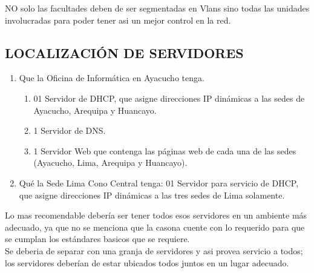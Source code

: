 NO solo las facultades deben de ser segmentadas en Vlans sino todas las unidades involucradas para poder tener asi un mejor control en la red.
\subsection{LOCALIZACI\'ON DE SERVIDORES}
\begin{definicion}[]
{
\begin{enumerate}[label=\itembolasazules{}]
\item Que la Oficina de Inform\'atica en Ayacucho tenga.

\begin{enumerate}[label=\itembolas{}]
\item 01 Servidor de DHCP, que asigne direcciones IP din\'amicas a las
sedes de Ayacucho, Arequipa y Huancayo.
\item 1 Servidor de DNS.
\item 1 Servidor Web que contenga las p\'aginas web de cada una de las
sedes (Ayacucho, Lima, Arequipa y Huancayo).
\end{enumerate}

\item Qu\'e la Sede Lima Cono Central tenga: 01 Servidor para servicio de DHCP, que asigne direcciones IP
din\'amicas a las tres sedes de Lima solamente.
\end{enumerate}
}

\end{definicion}
Lo mas recomendable deber\'ia ser tener todos esos servidores en un ambiente m\'as adecuado, ya que no se menciona que la casona cuente con lo requerido para que se cumplan los est\'andares basicos que se requiere.
\\
Se deberia de separar con una granja de servidores y asi provea servicio a todos; los servidores deber\'ian de estar ubicados todos juntos en un lugar adecuado.

